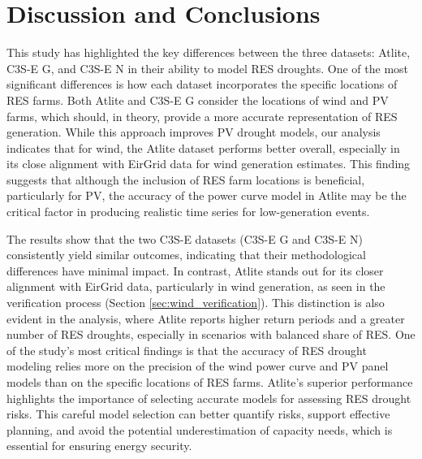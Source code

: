 \documentclass[a4paper, 11pt]{article}
\begin{document}
\newpage
\section{Discussion and Conclusions}
\label{sec:Conclusion}

This study has highlighted the key differences between the three datasets: Atlite, C3S-E G, and C3S-E N in their ability to model RES droughts. One of the most significant differences is how each dataset incorporates the specific locations of RES farms. Both Atlite and C3S-E G consider the locations of wind and PV farms, which should, in theory, provide a more accurate representation of RES generation. While this approach improves PV drought models, our analysis indicates that for wind, the Atlite dataset performs better overall, especially in its close alignment with EirGrid data for wind generation estimates. This finding suggests that although the inclusion of RES farm locations is beneficial, particularly for PV, the accuracy of the power curve model in Atlite may be the critical factor in producing realistic time series for low-generation events.

The results show that the two C3S-E datasets (C3S-E G and C3S-E N) consistently yield similar outcomes, indicating that their methodological differences have minimal impact. In contrast, Atlite stands out for its closer alignment with EirGrid data, particularly in wind generation, as seen in the verification process (Section \ref{sec:wind_verification}). This distinction is also evident in the analysis, where Atlite reports higher return periods and a greater number of RES droughts, especially in scenarios with balanced share of RES. One of the study's most critical findings is that the accuracy of RES drought modeling relies more on the precision of the wind power curve and PV panel models than on the specific locations of RES farms. Atlite’s superior performance highlights the importance of selecting accurate models for assessing RES drought risks. This careful model selection can better quantify risks, support effective planning, and avoid the potential underestimation of capacity needs, which is essential for ensuring energy security.
\end{document}
